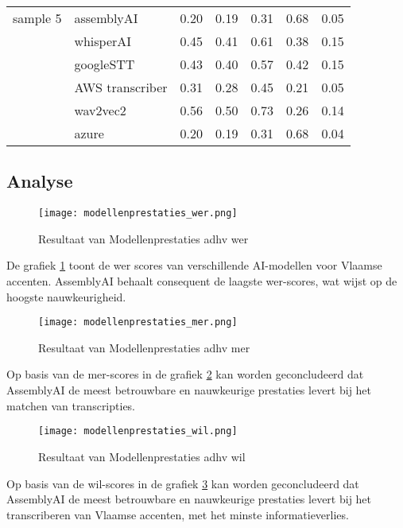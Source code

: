 \begin{table}[htbp]
\begin{tabularx}{\textwidth}{|l|l|X|X|X|X|X|}
         sample 5 & assemblyAI & 0.20 & 0.19 & 0.31 & 0.68 & 0.05\\
        & whisperAI & 0.45 & 0.41 & 0.61 & 0.38 & 0.15\\
        & googleSTT & 0.43 & 0.40 & 0.57 & 0.42  & 0.15 \\
        & AWS transcriber & 0.31 & 0.28 & 0.45 & 0.21 & 0.05 \\
        & wav2vec2 & 0.56 & 0.50 & 0.73 & 0.26 & 0.14 \\
        & azure & 0.20 & 0.19 & 0.31 & 0.68 & 0.04 \\
        \hline
        
                
    \end{tabularx}
\end{table}
\FloatBarrier 

\subsection{Analyse}

\begin{figure}[h]
    \centering
    \texttt{[image: modellenprestaties\_wer.png]}
    \captionsetup{justification=centering}
    \caption{Resultaat van Modellenprestaties adhv \gls{wer}}
    \label{fig:modellenprestaties_wer}
\end{figure}
\FloatBarrier

De grafiek \ref{fig:modellenprestaties_wer} toont de \gls{wer} scores van verschillende AI-modellen voor Vlaamse accenten. AssemblyAI behaalt consequent de laagste \gls{wer}-scores, wat wijst op de hoogste nauwkeurigheid.
\begin{figure}[h]
    \centering
    \texttt{[image: modellenprestaties\_mer.png]}
    \captionsetup{justification=centering}
    \caption{Resultaat van Modellenprestaties adhv \gls{mer}}
    \label{fig:modellenprestaties_mer}
\end{figure}
\FloatBarrier

Op basis van de \gls{mer}-scores in de grafiek \ref{fig:modellenprestaties_mer} kan worden geconcludeerd dat AssemblyAI de meest betrouwbare en nauwkeurige prestaties levert bij het matchen van transcripties.

\begin{figure}[h]
    \centering
    \texttt{[image: modellenprestaties\_wil.png]}
    \captionsetup{justification=centering}
    \caption{Resultaat van Modellenprestaties adhv \gls{wil}}
    \label{fig:modellenprestaties_wil}
\end{figure}
\FloatBarrier
Op basis van de \gls{wil}-scores in de grafiek \ref{fig:modellenprestaties_wil} kan worden geconcludeerd dat AssemblyAI de meest betrouwbare en nauwkeurige prestaties levert bij het transcriberen van Vlaamse accenten, met het minste informatieverlies.


